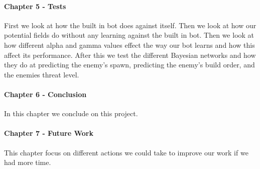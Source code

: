\paragraph*{Chapter 5 - Tests}
First we look at how the built in bot does against itself. Then we look at how our potential fields do without any learning against the built in bot. Then we look at how different alpha and gamma values effect the way our bot learns and how this affect its performance. After this we test the different Bayesian networks and how they do at predicting the enemy's spawn, predicting the enemy's build order, and the enemies threat level.

\paragraph*{Chapter 6 - Conclusion}
In this chapter we conclude on this project.

\paragraph*{Chapter 7 - Future Work}
This chapter focus on different actions we could take to improve our work if we had more time.
